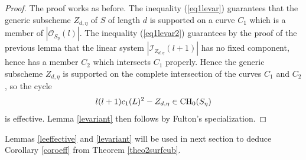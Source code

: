 \documentclass[10pt]{article}
\begin{document}
\begin{proof} The proof works as before. The inequality (\ref{eq1levar}) guarantees that the generic subscheme $Z_{d,\eta}$ of $S$ of length $d$ is supported on a curve $C_1$ which is a member of $|\mathcal{O}_{S_\eta}(l) |$. The inequality (\ref{eq1levar2})  guarantees by the proof of  the previous lemma that the linear system  $|\mathcal{I}_{Z_{d,\eta}}(l+1) |$ has no fixed component, hence has a member $C_2$ which intersects $C_1$ properly.  Hence the generic subscheme
$Z_{d,\eta}$ is supported on the complete intersection of the curves $C_1$ and $C_2$, so the cycle
$$l(l+1) c_1(L)^2-Z_{d,\eta}\in {\rm CH}_0(S_\eta)$$
is effective.  Lemma \ref{levariant} then  follows by Fulton's specialization.
\end{proof}


 Lemmas \ref{leeffective} and \ref{levariant} will be used in next  section to deduce Corollary \ref{coroeff} from Theorem \ref{theo2surfcub}.
\end{document}
